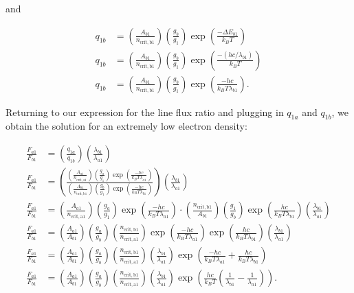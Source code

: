 \documentclass[12pt]{article}
\begin{document}
and

\begin{equation*}
\begin{split}
q_{1b} &= \left(\frac{A_{b1}}{n_\mathrm{crit,b1}}\right) \left(\frac{g_b}{g_1}\right) \exp \left(\frac{- \Delta E_{b1}}{k_BT}\right) \\
q_{1b} &= \left(\frac{A_{b1}}{n_\mathrm{crit,b1}}\right) \left(\frac{g_b}{g_1}\right) \exp \left(\frac{- (hc/\lambda_{b1})}{k_BT}\right) \\
q_{1b} &= \left(\frac{A_{b1}}{n_\mathrm{crit,b1}}\right) \left(\frac{g_b}{g_1}\right) \exp \left(\frac{- hc}{k_BT\lambda_{b1}}\right).
\end{split}
\end{equation*}

Returning to our expression for the line flux ratio and plugging in $q_{1a}$ and $q_{1b}$, we obtain the solution for an extremely low electron density:

\begin{equation*}
\begin{split}
\frac{F_{a1}}{F_{b1}} &= \left(\frac{q_{1a}}{q_{1b}}\right) \left(\frac{\lambda_{b1}}{\lambda_{a1}}\right) \\
\frac{F_{a1}}{F_{b1}} &= \left(\frac{\left(\frac{A_{a1}}{n_\mathrm{crit,a1}}\right) \left(\frac{g_a}{g_1}\right) \exp \left(\frac{- hc}{k_BT\lambda_{a1}}\right)}{\left(\frac{A_{b1}}{n_\mathrm{crit,b1}}\right) \left(\frac{g_b}{g_1}\right) \exp \left(\frac{- hc}{k_BT\lambda_{b1}}\right)}\right) \left(\frac{\lambda_{b1}}{\lambda_{a1}}\right) \\
\frac{F_{a1}}{F_{b1}} &= \left(\frac{A_{a1}}{n_\mathrm{crit,a1}}\right) \left(\frac{g_a}{g_1}\right) \exp \left(\frac{- hc}{k_BT\lambda_{a1}}\right) \cdot \left(\frac{n_\mathrm{crit,b1}}{A_{b1}}\right) \left(\frac{g_1}{g_b}\right) \exp \left(\frac{hc}{k_BT\lambda_{b1}}\right) \left(\frac{\lambda_{b1}}{\lambda_{a1}}\right) \\
\frac{F_{a1}}{F_{b1}} &= \left(\frac{A_{a1}}{A_{b1}}\right) \left(\frac{g_a}{g_b}\right) \left(\frac{n_\mathrm{crit,b1}}{n_\mathrm{crit,a1}}\right) \exp \left(\frac{- hc}{k_BT\lambda_{a1}}\right) \exp \left(\frac{hc}{k_BT\lambda_{b1}}\right) \left(\frac{\lambda_{b1}}{\lambda_{a1}}\right) \\
\frac{F_{a1}}{F_{b1}} &= \left(\frac{A_{a1}}{A_{b1}}\right) \left(\frac{g_a}{g_b}\right) \left(\frac{n_\mathrm{crit,b1}}{n_\mathrm{crit,a1}}\right) \left(\frac{\lambda_{b1}}{\lambda_{a1}}\right) \exp \left(\frac{- hc}{k_BT\lambda_{a1}} + \frac{hc}{k_BT\lambda_{b1}}\right) \\
\frac{F_{a1}}{F_{b1}} &= \left(\frac{A_{a1}}{A_{b1}}\right) \left(\frac{g_a}{g_b}\right) \left(\frac{n_\mathrm{crit,b1}}{n_\mathrm{crit,a1}}\right) \left(\frac{\lambda_{b1}}{\lambda_{a1}}\right) \exp \left(\frac{hc}{k_BT} \left(\frac{1}{\lambda_{b1}} - \frac{1}{\lambda_{a1}}\right)\right).
\end{split}
\end{equation*}
\end{document}
